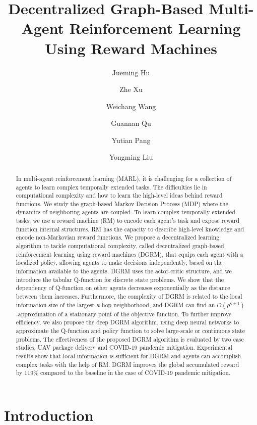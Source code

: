 \documentclass[conf]{new-aiaa}
\title{Decentralized Graph-Based Multi-Agent Reinforcement Learning Using Reward Machines}
\author[1]{Jueming Hu}
\author[1]{Zhe Xu}
\author[1]{Weichang Wang}
\author[2]{Guannan Qu}
\author[1]{Yutian Pang}
\author[1]{Yongming Liu}
\affil[1]{Arizona State University}
\affil[2]{Carnegie Mellon University}
\def\foo ABC{DGRM}
\begin{document}
\maketitle
\begin{abstract}

In multi-agent reinforcement learning (MARL), it is challenging for a collection of agents to learn complex temporally extended tasks. The difficulties lie in computational complexity and how to learn the high-level ideas behind reward functions. We study the graph-based Markov Decision Process (MDP) where the dynamics of neighboring agents are coupled. To learn complex temporally extended tasks, we use a reward machine (RM) to encode each agent's task and expose reward function internal structures. RM has the capacity to describe high-level knowledge and encode non-Markovian reward functions. We propose a decentralized learning algorithm to tackle computational complexity, called decentralized graph-based reinforcement learning using reward machines (\foo ABC), that equips each agent with a localized policy, allowing agents to make decisions independently, based on the information available to the agents. \foo ABC uses the actor-critic structure, and we introduce the tabular Q-function for discrete state problems. We show that the dependency of Q-function on other agents decreases exponentially as the distance between them increases. Furthermore, the complexity of \foo ABC is related to the local information size of the largest $\kappa$-hop neighborhood, and \foo ABC can find an $O(\rho^{\kappa+1})$-approximation of a stationary point of the objective function. To further improve efficiency, we also propose the deep \foo ABC algorithm, using deep neural networks to approximate the Q-function and policy function to solve large-scale or continuous state problems. The effectiveness of the proposed \foo ABC algorithm is evaluated by two case studies, UAV package delivery and COVID-19 pandemic mitigation. Experimental results show that local information is sufficient for \foo ABC and agents can accomplish complex tasks with the help of RM. \foo ABC improves the global accumulated reward by 119\% compared to the baseline in the case of COVID-19 pandemic mitigation. 




\end{abstract}

\section{Introduction}
\end{document}
